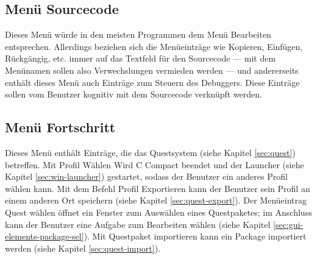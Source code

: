 \subsection{Menü \glqq{}Sourcecode\grqq{}}
\label{sec:gui-menu-code}
Dieses Menü würde in den meisten Programmen dem Menü \glqq{}Bearbeiten\grqq{} entsprechen. Allerdings beziehen sich die Menüeinträge wie \glqq{}Kopieren\grqq{}, \glqq{}Einfügen\grqq{}, \glqq{}Rückgängig\grqq{}, etc. immer auf das Textfeld für den Sourcecode --- mit dem Menünamen sollen also Verwechslungen vermieden werden --- und andererseits enthält dieses Menü auch Einträge zum Steuern des Debuggers. Diese Einträge sollen vom Benutzer kognitiv mit dem Sourcecode verknüpft werden.

\subsection{Menü \glqq{}Fortschritt\grqq{}}
Dieses Menü enthält Einträge, die das Questsystem (siehe Kapitel \ref{sec:quest}) betreffen. Mit \glqq{}Profil Wählen\grqq{} Wird C Compact beendet und der Launcher (siehe Kapitel \ref{sec:win-launcher}) gestartet, sodass der Benutzer ein anderes Profil wählen kann. Mit dem Befehl \glqq{}Profil Exportieren\grqq{} kann der Benutzer sein Profil an einem anderen Ort speichern (siehe Kapitel \ref{sec:quest-export}). Der Menüeintrag \glqq{}Quest wählen\grqq{} öffnet ein Fenster zum Auswählen eines Questpaketes; im Anschluss kann der Benutzer eine Aufgabe zum Bearbeiten wählen (siehe Kapitel \ref{sec:gui-elements-package-sel}). Mit \glqq{}Questpaket importieren\grqq{} kann ein Package importiert werden (siehe Kapitel \ref{sec:quest-import}).

